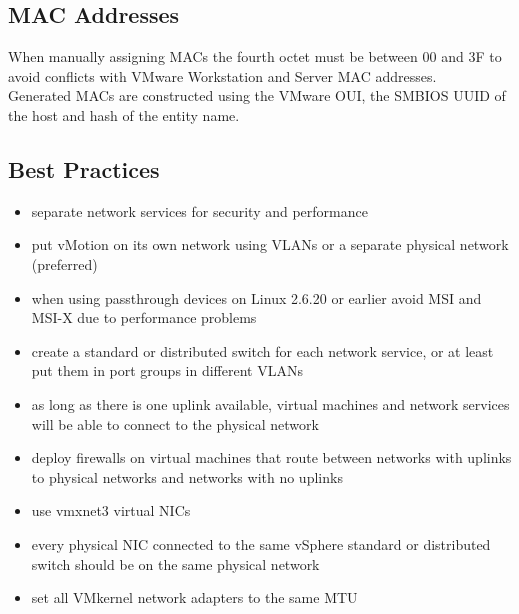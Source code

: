 \documentclass{article}
\begin{document}
\subsection{MAC Addresses}

When manually assigning MACs the fourth octet must be between 00 and 3F to
avoid conflicts with VMware Workstation and Server MAC addresses.\\

Generated MACs are constructed using the VMware OUI, the SMBIOS UUID of the
host and hash of the entity name.

\subsection{Best Practices}

\begin{itemize}

\item separate network services for security and performance

\item put vMotion on its own network using VLANs or a separate physical network
(preferred)

\item when using passthrough devices on Linux 2.6.20 or earlier avoid MSI
and MSI-X due to performance problems

\item create a standard or distributed switch for each network service, or
at least put them in port groups in different VLANs

\item as long as there is one uplink available, virtual machines and network
services will be able to connect to the physical network

\item deploy firewalls on virtual machines that route between networks with
uplinks to physical networks and networks with no uplinks

\item use vmxnet3 virtual NICs

\item every physical NIC connected to the same vSphere standard or distributed
switch should be on the same physical network

\item set all VMkernel network adapters to the same MTU

\end{itemize}
\end{document}
